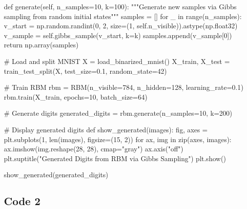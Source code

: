 \documentclass[%
oneside,                 %
final,                   %
10pt]{article}
\begin{document}
    def generate(self, n_samples=10, k=100):
        """Generate new samples via Gibbs sampling from random initial states"""
        samples = []
        for _ in range(n_samples):
            v_start = np.random.randint(0, 2, size=(1, self.n_visible)).astype(np.float32)
            v_sample = self.gibbs_sample(v_start, k=k)
            samples.append(v_sample[0])
        return np.array(samples)

# Load and split MNIST
X = load_binarized_mnist()
X_train, X_test = train_test_split(X, test_size=0.1, random_state=42)

# Train RBM
rbm = RBM(n_visible=784, n_hidden=128, learning_rate=0.1)
rbm.train(X_train, epochs=10, batch_size=64)

# Generate digits
generated_digits = rbm.generate(n_samples=10, k=200)

# Display generated digits
def show_generated(images):
    fig, axes = plt.subplots(1, len(images), figsize=(15, 2))
    for ax, img in zip(axes, images):
        ax.imshow(img.reshape(28, 28), cmap="gray")
        ax.axis("off")
    plt.suptitle("Generated Digits from RBM via Gibbs Sampling")
    plt.show()

show_generated(generated_digits)

\epycod


\subsection{Code 2}
\end{document}
